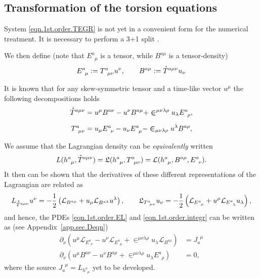 \documentclass[
10pt, %
a4paper, %
oneside, %
headinclude,footinclude, %
BCOR5mm, %
]{scrartcl}
\newcommand{\tetrsymbol}{h}
\newcommand{\tetr}[2]{\tetrsymbol^{#1}_{\phantom{#1}#2}}
\newcommand{\D}[1]{\partial_{#1}} %
\newcommand{\Tors}[2]{T^{#1}_{\phantom{a}#2}}
\newcommand{\ET}[2]{E^{#1}_{\phantom{#1}#2}}	%
\newcommand{\BT}[2]{B^{#1#2}}	%
\newcommand{\Laghodge}{L}%
\newcommand{\Lagtors}{\mathfrak{L}}%
\newcommand{\LagBE}{\mathcal{L}}%
\newcommand{\LCsymb}{\bm{\in}}    %
\newcommand{\HDT}[1]{\accentset{\star}{T}^{#1}}
\newcommand{\NC}[2]{J^{\phantom{#1}#2}_{#1}}
\begin{document}
\subsection{Transformation of the torsion equations}\label{sec.transform.potential}


System \eqref{eqn.1st.order.TEGR} is not yet in a convenient form for the numerical treatment. It 
is necessary to perform a 3+1 split \cite{Alcubierre2008}. 


We then define (note that $ \ET{a}{\mu} $ is a tensor, while $ \BT{a}{\mu} $ is a tensor-density)
\begin{equation}
\ET{a}{\mu} := \Tors{a}{\mu\nu} u^\nu, \qquad  \BT{a}{\mu} := \HDT{a\mu\nu} u_\nu
\end{equation}


It is known that for any skew-symmetric tensor and a time-like vector $ u^\mu $ the following 
decompositions holds
\begin{subequations}\label{eqn.T.decompos}
\begin{align}
\HDT{a\mu\nu} &= u^\mu \BT{a}{\nu} - u^\nu \BT{a}{\mu} + 
\LCsymb^{\mu\nu\lambda\rho}u_\lambda 
\ET{a}{\rho},\\[2mm]
\Tors{a}{\mu\nu} &= u_\mu \ET{a}{\nu} - u_\nu \ET{a}{\mu} - 
\LCsymb_{\mu\nu\lambda\rho}u^\lambda 
\BT{a}{\rho},
\end{align}
\end{subequations}

We assume that the Lagrangian density can be \textit{equivalently} written 
\begin{equation}\label{eqn.Lagrangians2}
\Laghodge(\tetr{a}{\mu},\HDT{a\mu\nu}) = \Lagtors(\tetr{a}{\mu},\Tors{a}{\mu\nu}) = 
\LagBE(\tetr{a}{\mu},\BT{a}{\mu},\ET{a}{\nu}).
\end{equation}
It then can be shown that the derivatives of these different representations of the Lagrangian are related as
\begin{equation}
\Laghodge_{\HDT{a\mu\nu}}u^\nu = -\frac12\left( \LagBE_{\BT{a}{\mu}} +u_\mu 
\LagBE_{\BT{a}{\lambda}} u^\lambda \right), 
\qquad 
\Lagtors_{\Tors{a}{\mu\nu}}u_\nu = -\frac12\left( \LagBE_{\ET{a}{\mu}} + u^\mu 
\LagBE_{\ET{a}{\lambda}} u_\lambda \right),
\end{equation}
and hence, the PDEs \eqref{eqn.1st.order.EL} and \eqref{eqn.1st.order.integr} 
can be written as (see Appendix~\eqref{app.sec.Deqn})
\begin{subequations}\label{eqn.tors.BE}
	\begin{align}
		\D{\nu}( u^\mu\LagBE_{\ET{a}{\nu}} - u^\nu \LagBE_{\ET{a}{\mu}} + 
		\LCsymb^{\mu\nu\lambda\rho}u_\lambda\LagBE_{\BT{a}{\rho}}) 
		&= \NC{a}{\mu}\label{eqn.tors.BE.a} \\[2mm]
%		
		\D{\nu}(u^\mu \BT{a}{\nu} - u^\nu\BT{a}{\mu} + 
		\LCsymb^{\mu\nu\lambda\rho}u_\lambda\ET{a}{\rho}) &= 0,
	\end{align}
\end{subequations}
where the source $ \NC{a}{\mu} = \Laghodge_{\tetr{a}{\mu}} $ yet to be developed.
\end{document}

